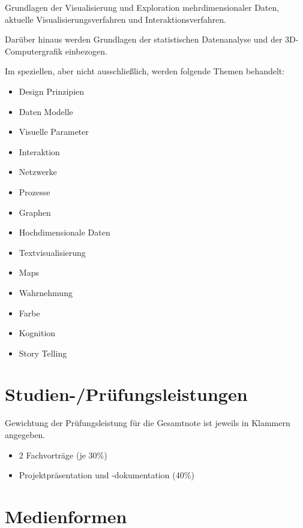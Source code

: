 Grundlagen der Visualisierung und Exploration mehrdimensionaler Daten,
aktuelle Visualisierungsverfahren und Interaktionsverfahren.

Darüber hinaus werden Grundlagen der statistischen Datenanalyse und der
3D-Computergrafik einbezogen.

Im speziellen, aber nicht ausschließlich, werden folgende Themen
behandelt:

\begin{itemize}
\tightlist
\item
  Design Prinzipien
\item
  Daten Modelle
\item
  Visuelle Parameter
\item
  Interaktion
\item
  Netzwerke
\item
  Prozesse
\item
  Graphen
\item
  Hochdimensionale Daten
\item
  Textvisualisierung
\item
  Maps
\item
  Wahrnehmung
\item
  Farbe
\item
  Kognition
\item
  Story Telling
\end{itemize}

\section*{Studien-/Prüfungsleistungen\label{/mi-2017/modulbeschreibungen-master/MA_VC_Modul_Visualisierung}}\label{studien-pruxfcfungsleistungenpathlabelmi-2017modulbeschreibungen-mastermaux5fvcux5fmodulux5fvisualisierung}

Gewichtung der Prüfungsleistung für die Gesamtnote ist jeweils in
Klammern angegeben.

\begin{itemize}
\tightlist
\item
  2 Fachvorträge (je 30\%)
\item
  Projektpräsentation und -dokumentation (40\%)
\end{itemize}

\section*{Medienformen\label{/mi-2017/modulbeschreibungen-master/MA_VC_Modul_Visualisierung}}\label{medienformenpathlabelmi-2017modulbeschreibungen-mastermaux5fvcux5fmodulux5fvisualisierung}

